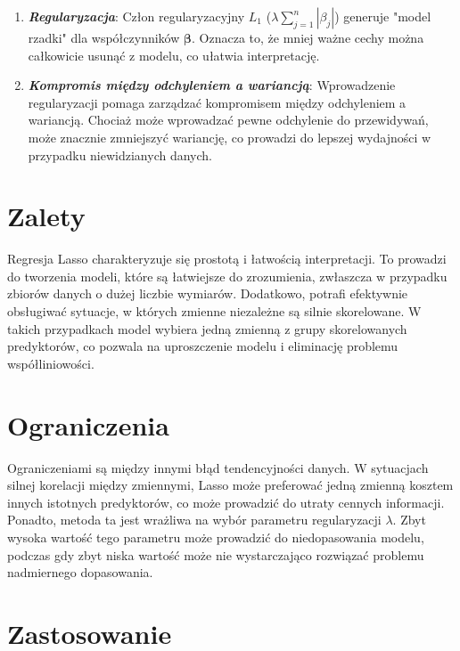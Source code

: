 \begin{enumerate}
    \item \textbf{\textit{Regularyzacja}}: Człon regularyzacyjny $L_1$ ($\lambda \sum_{j=1}^{n} |\beta_j|$) generuje "model rzadki" dla współczynników $\boldsymbol{ \beta }$. Oznacza to, że mniej ważne cechy można całkowicie usunąć z modelu, co ułatwia interpretację.
    
    \item \textbf{\textit{Kompromis między odchyleniem a wariancją}}: Wprowadzenie regularyzacji pomaga zarządzać kompromisem między odchyleniem a wariancją. Chociaż może wprowadzać pewne odchylenie do przewidywań, może znacznie zmniejszyć wariancję, co prowadzi do lepszej wydajności w przypadku niewidzianych danych.
\end{enumerate}

{}
\section*{Zalety}
\vspace{-1.0em}


Regresja Lasso charakteryzuje się prostotą i łatwością interpretacji. To prowadzi do tworzenia modeli, które są łatwiejsze do zrozumienia, zwłaszcza w przypadku zbiorów danych o dużej liczbie wymiarów. Dodatkowo, potrafi efektywnie obsługiwać sytuacje, w których zmienne niezależne są silnie skorelowane. W takich przypadkach model wybiera jedną zmienną z grupy skorelowanych predyktorów, co pozwala na uproszczenie modelu i eliminację problemu współliniowości.

{}
\section*{Ograniczenia}
\vspace{-1.0em}


Ograniczeniami są między innymi błąd tendencyjności danych. W sytuacjach silnej korelacji między zmiennymi, Lasso może preferować jedną zmienną kosztem innych istotnych predyktorów, co może prowadzić do utraty cennych informacji. Ponadto, metoda ta jest wrażliwa na wybór parametru regularyzacji $\lambda$. Zbyt wysoka wartość tego parametru może prowadzić do niedopasowania modelu, podczas gdy zbyt niska wartość może nie wystarczająco rozwiązać problemu nadmiernego dopasowania.

{}
\section*{Zastosowanie}
\vspace{-1.0em}


